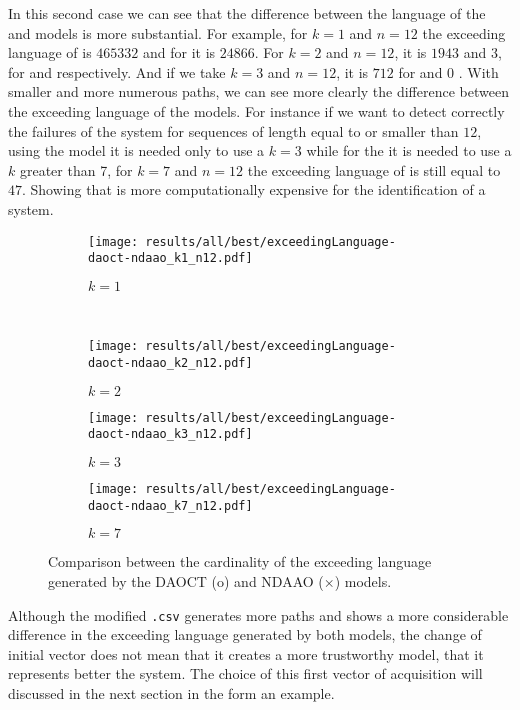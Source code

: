 In this second case we can see that the difference between the language of the \DAOCT{} and
\NDAAO{} models is more substantial. For example, for $k=1$ and $n=12$ the
exceeding language of \NDAAO{} is $465332$ and for \DAOCT{} it is $24866$. For
$k=2$ and $n=12$, it is $1943$ and $3$, for \NDAAO{} and \DAOCT{} respectively. And
if we take $k=3$ and $n=12$, it is $712$ for \NDAAO{} and $0$ \DAOCT{}. With
smaller and more numerous paths, we can see more clearly the difference between the
exceeding language of the models. For instance if we want to detect correctly
the failures of the system for sequences of length equal to or smaller
than $12$, using the \DAOCT{} model it is needed only to use a $k=3$ while for the
\NDAAO{} it is needed to use a $k$ greater than 7, for $k=7$ and $n=12$ the
exceeding language of \NDAAO{} is still equal to $47$. Showing that \NDAAO{} is more
computationally expensive for the identification of a system.

\begin{figure}[H]
  \begin{subfigure}[H]{0.5\textwidth}
    \centering
    \texttt{[image: results/all/best/exceedingLanguage-daoct-ndaao\_k1\_n12.pdf]}
    \caption{$k=1$}
    \label{fig:daoctNdaaoBestkone}
  \end{subfigure}
  ~
  \begin{subfigure}[h]{0.5\textwidth}
    \centering
    \texttt{[image: results/all/best/exceedingLanguage-daoct-ndaao\_k2\_n12.pdf]}
    \caption{$k=2$}
    \label{fig:daoctNdaaoBestktwo}
  \end{subfigure}
  \begin{subfigure}[h]{0.5\textwidth}
    \centering
    \texttt{[image: results/all/best/exceedingLanguage-daoct-ndaao\_k3\_n12.pdf]}
    \caption{$k=3$}
    \label{fig:daoctNdaaoBestkthree}
  \end{subfigure}
  \begin{subfigure}[h]{0.5\textwidth}
    \centering
    \texttt{[image: results/all/best/exceedingLanguage-daoct-ndaao\_k7\_n12.pdf]}
    \caption{$k=7$}
    \label{fig:daoctNdaaoBestkseven}
  \end{subfigure}
  \caption{Comparison between the cardinality of the exceeding language generated by the DAOCT (o) and
NDAAO ($\times$) models.}
\end{figure}
Although the modified \verb|.csv| generates more paths and shows a more
considerable difference in the exceeding language generated by both models, the
change of initial vector does not mean that it creates a more trustworthy model,
that it represents better the
system. The choice of this first vector of acquisition will discussed in the
next section in the form an example.
\newpage

